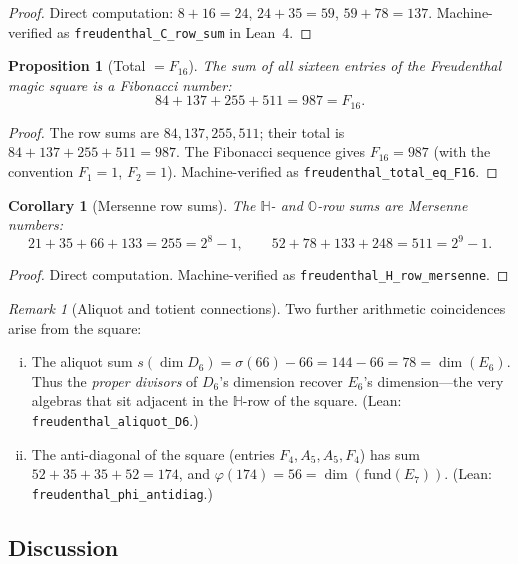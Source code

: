 \documentclass[11pt]{amsart}
\theoremstyle{plain}
\newtheorem{proposition}[theorem]{Proposition}
\newtheorem{corollary}[theorem]{Corollary}
\theoremstyle{definition}
\theoremstyle{remark}
\newtheorem{remark}[theorem]{Remark}
\begin{document}
\begin{proof}
Direct computation: $8 + 16 = 24$, $24 + 35 = 59$, $59 + 78 = 137$.
Machine-verified as \texttt{freudenthal\_C\_row\_sum} in Lean~4.
\end{proof}

\begin{proposition}[Total $= F_{16}$]\label{prop:total-F16}
The sum of all sixteen entries of the Freudenthal magic square is
a Fibonacci number:
\[
84 + 137 + 255 + 511 = 987 = F_{16}.
\]
\end{proposition}

\begin{proof}
The row sums are $84, 137, 255, 511$; their total is
$84 + 137 + 255 + 511 = 987$.
The Fibonacci sequence gives $F_{16} = 987$
(with the convention $F_1 = 1$, $F_2 = 1$).
Machine-verified as \texttt{freudenthal\_total\_eq\_F16}.
\end{proof}

\begin{corollary}[Mersenne row sums]\label{cor:mersenne-rows}
The $\mathbb{H}$- and $\mathbb{O}$-row sums are Mersenne numbers:
\[
21 + 35 + 66 + 133 = 255 = 2^8 - 1, \qquad
52 + 78 + 133 + 248 = 511 = 2^9 - 1.
\]
\end{corollary}

\begin{proof}
Direct computation.  Machine-verified as
\texttt{freudenthal\_H\_row\_mersenne}.
\end{proof}

\begin{remark}[Aliquot and totient connections]\label{rem:freudenthal-arith}
Two further arithmetic coincidences arise from the square:
\begin{enumerate}[(i)]
\item The aliquot sum $s(\dim D_6) = \sigma(66) - 66
      = 144 - 66 = 78 = \dim(E_6)$.
      Thus the \emph{proper divisors} of $D_6$'s dimension recover
      $E_6$'s dimension---the very algebras that sit adjacent in the
      $\mathbb{H}$-row of the square.
      (Lean: \texttt{freudenthal\_aliquot\_D6}.)
\item The anti-diagonal of the square (entries $F_4, A_5, A_5, F_4$)
      has sum $52 + 35 + 35 + 52 = 174$, and
      $\varphi(174) = 56 = \dim(\mathrm{fund}(E_7))$.
      (Lean: \texttt{freudenthal\_phi\_antidiag}.)
\end{enumerate}
\end{remark}

\subsection{Discussion}
\end{document}
